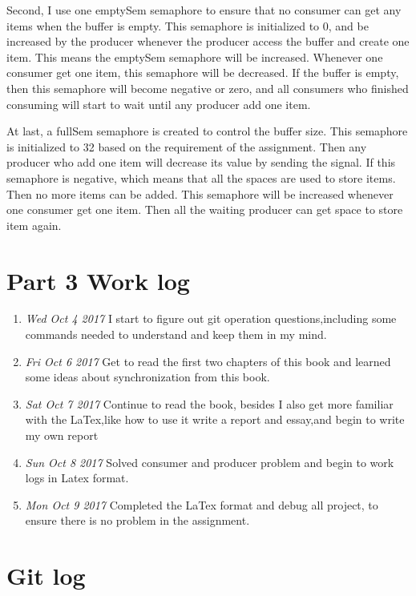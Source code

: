 \documentclass[10pt,draftclsnofoot,peerreview,letterpaper,onecolumn,]{IEEEtran}
\begin{document}
Second, I use one emptySem semaphore to ensure that no consumer can get any items when the buffer is empty. This semaphore is initialized to 0, and be increased by the producer whenever the producer access the buffer and create one item. This means the emptySem semaphore will be increased. Whenever one consumer get one item, this semaphore will be decreased. If the buffer is empty, then this semaphore will become negative or zero, and all consumers who finished consuming will start to wait until any producer add one item.

At last, a fullSem semaphore is created to control the buffer size. This semaphore is initialized to 32 based on the requirement of the assignment. Then any producer who add one item will decrease its value by sending the signal. If this semaphore is negative, which means that all the spaces are used to store items. Then no more items can be added. This semaphore will be increased whenever one consumer get one item. Then all the waiting producer can get space to store item again.

\section{Part 3 Work log}
\begin{enumerate}
\item \emph{Wed Oct 4 2017} I start to figure out git operation questions,including some commands needed to understand and keep them in my mind. 
\item \emph{Fri Oct 6 2017} Get to read the first two chapters of this book and learned some ideas about synchronization from this book.
\item \emph{Sat Oct 7 2017} Continue to read the book, besides I also get more familiar with the LaTex,like how to use it write a report and essay,and begin to write my own report
\item \emph{Sun Oct 8 2017} Solved consumer and producer problem and begin to work logs in Latex format.
\item \emph{Mon Oct 9 2017} Completed the LaTex format and debug all project, to ensure there is no problem in the assignment.
\end{enumerate}


\section{Git log}
\end{document}
